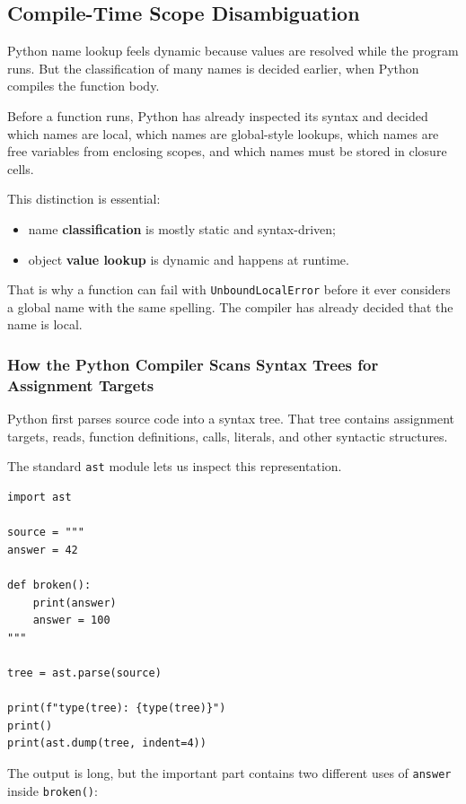 \subsection{Compile-Time Scope Disambiguation}

Python name lookup feels dynamic because values are resolved while the program runs. But the classification of many names is decided earlier, when Python compiles the function body.

Before a function runs, Python has already inspected its syntax and decided which names are local, which names are global-style lookups, which names are free variables from enclosing scopes, and which names must be stored in closure cells.

This distinction is essential:

\begin{itemize}
    \item name \textbf{classification} is mostly static and syntax-driven;
    \item object \textbf{value lookup} is dynamic and happens at runtime.
\end{itemize}

That is why a function can fail with \texttt{UnboundLocalError} before it ever considers a global name with the same spelling. The compiler has already decided that the name is local.

\subsubsection{How the Python Compiler Scans Syntax Trees for Assignment Targets}

Python first parses source code into a syntax tree. That tree contains assignment targets, reads, function definitions, calls, literals, and other syntactic structures.

The standard \texttt{ast} module lets us inspect this representation.

\begin{verbatim}
import ast

source = """
answer = 42

def broken():
    print(answer)
    answer = 100
"""

tree = ast.parse(source)

print(f"type(tree): {type(tree)}")
print()
print(ast.dump(tree, indent=4))
\end{verbatim}

The output is long, but the important part contains two different uses of \texttt{answer} inside \texttt{broken()}:

